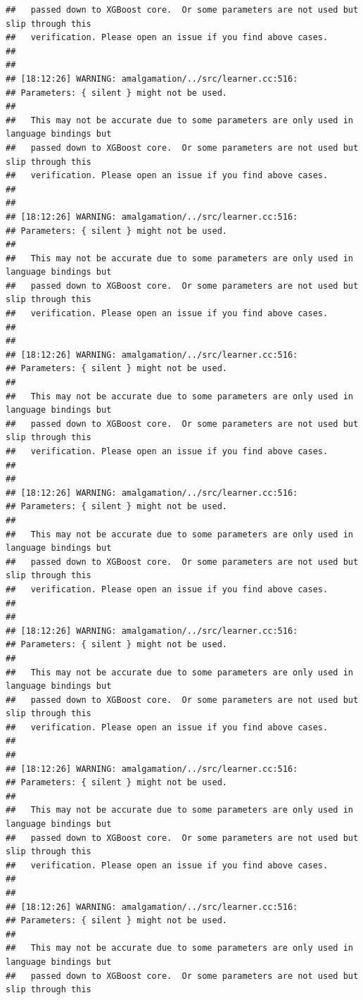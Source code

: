 \documentclass[AMS,STIX2COL]{WileyNJD-v2}\usepackage[]{graphicx}\usepackage[]{color}
\makeatletter
\newenvironment{kframe}{%
 \def\at@end@of@kframe{}%
 \ifinner\ifhmode%
  \def\at@end@of@kframe{\end{minipage}}%
  \begin{minipage}{\columnwidth}%
 \fi\fi%
 \def\FrameCommand##1{\hskip\@totalleftmargin \hskip-\fboxsep
 \colorbox{shadecolor}{##1}\hskip-\fboxsep
     \hskip-\linewidth \hskip-\@totalleftmargin \hskip\columnwidth}%
 \MakeFramed {\advance\hsize-\width
   \@totalleftmargin\z@ \linewidth\hsize
   \@setminipage}}%
 {\par\unskip\endMakeFramed%
 \at@end@of@kframe}
\newenvironment{knitrout}{}{} %
\makeatother
\begin{document}
\begin{knitrout}
\begin{kframe}
\begin{verbatim}
##   passed down to XGBoost core.  Or some parameters are not used but slip through this
##   verification. Please open an issue if you find above cases.
## 
## 
## [18:12:26] WARNING: amalgamation/../src/learner.cc:516: 
## Parameters: { silent } might not be used.
## 
##   This may not be accurate due to some parameters are only used in language bindings but
##   passed down to XGBoost core.  Or some parameters are not used but slip through this
##   verification. Please open an issue if you find above cases.
## 
## 
## [18:12:26] WARNING: amalgamation/../src/learner.cc:516: 
## Parameters: { silent } might not be used.
## 
##   This may not be accurate due to some parameters are only used in language bindings but
##   passed down to XGBoost core.  Or some parameters are not used but slip through this
##   verification. Please open an issue if you find above cases.
## 
## 
## [18:12:26] WARNING: amalgamation/../src/learner.cc:516: 
## Parameters: { silent } might not be used.
## 
##   This may not be accurate due to some parameters are only used in language bindings but
##   passed down to XGBoost core.  Or some parameters are not used but slip through this
##   verification. Please open an issue if you find above cases.
## 
## 
## [18:12:26] WARNING: amalgamation/../src/learner.cc:516: 
## Parameters: { silent } might not be used.
## 
##   This may not be accurate due to some parameters are only used in language bindings but
##   passed down to XGBoost core.  Or some parameters are not used but slip through this
##   verification. Please open an issue if you find above cases.
## 
## 
## [18:12:26] WARNING: amalgamation/../src/learner.cc:516: 
## Parameters: { silent } might not be used.
## 
##   This may not be accurate due to some parameters are only used in language bindings but
##   passed down to XGBoost core.  Or some parameters are not used but slip through this
##   verification. Please open an issue if you find above cases.
## 
## 
## [18:12:26] WARNING: amalgamation/../src/learner.cc:516: 
## Parameters: { silent } might not be used.
## 
##   This may not be accurate due to some parameters are only used in language bindings but
##   passed down to XGBoost core.  Or some parameters are not used but slip through this
##   verification. Please open an issue if you find above cases.
## 
## 
## [18:12:26] WARNING: amalgamation/../src/learner.cc:516: 
## Parameters: { silent } might not be used.
## 
##   This may not be accurate due to some parameters are only used in language bindings but
##   passed down to XGBoost core.  Or some parameters are not used but slip through this

\end{verbatim}
\end{kframe}
\end{knitrout}
\end{document}
